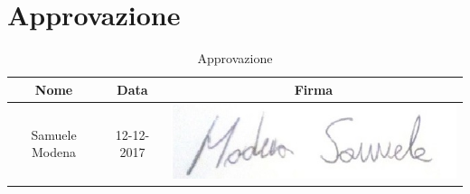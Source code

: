 \documentclass[./PianodiProgetto.tex]{subfiles}
\begin{document}
\section{Approvazione}
\begin{table}[H]
	\centering
	\begin{tabular}{|c|c|c|}
		\hline
		Nome&Data&Firma \\ \hline
		Samuele Modena& 12-12-2017 & \includegraphics[scale=0.5]{img/firme/ModenaSamuele} \\
		\hline
	\end{tabular}
	\caption{Approvazione}
\end{table}
\end{document}
